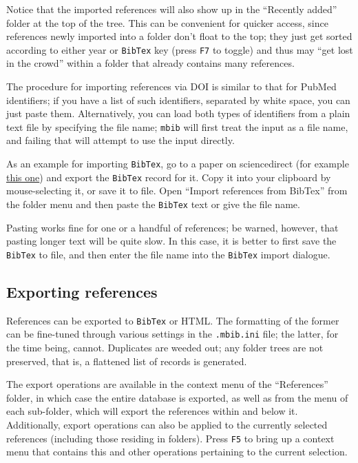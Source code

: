 \documentclass[10pt]{article}
\newcommand*{\mbib}{\texttt{mbib}\xspace}
\newcommand*{\bibtex}{\texttt{BibTex}\xspace}
\newcommand*{\key}[1]{\texttt{#1}\xspace}
\begin{document}
Notice that the imported references will also show up in the ``Recently added'' folder at the top of the tree. This can be convenient for quicker access, since references newly imported into a folder don't float to the top; they just get sorted according to either year or \bibtex key (press \key{F7} to toggle) and thus may ``get lost in the crowd'' within a folder that already contains many references.

The procedure for importing references via DOI is similar to that for PubMed identifiers; if you have a list of such identifiers, separated by white space, you can just paste them. Alternatively, you can load both types of identifiers from a plain text file by specifying the file name; \mbib will first treat the input as a file name, and failing that will attempt to use the input directly. 
 
As an example for importing \bibtex, go to a paper on 
sciencedirect (for example \href{https://doi.org/10.1016/j.bbamem.2014.05.014}{this one}) and export the \bibtex record for it. Copy it into your clipboard by mouse-selecting it, or save it to file. Open ``Import references from BibTex'' from the folder menu and then paste the \bibtex text or give the file name. 

Pasting works fine for one or a handful of references;  be warned, however, that pasting longer text will be quite slow. In this case, it is better to first save the \bibtex to file, and then enter the file name into the \bibtex import dialogue. 

\subsection{Exporting references}
\label{sec:export}


References can be exported to \bibtex or HTML. The formatting of the former can be fine-tuned through various settings in the \texttt{.mbib.ini} file; the latter, for the time being, cannot. Duplicates are weeded out; any folder trees are not preserved, that is, a flattened list of records is generated. 

The export operations are available in the context menu of the ``References'' folder, in which case the entire database is exported, as well as from the menu of each sub-folder, which will export the references within and below it. Additionally, export operations can also be applied to the currently selected references (including those residing in folders). Press \key{F5} to bring up a context menu that contains this and other operations pertaining to the current selection.
\end{document}
